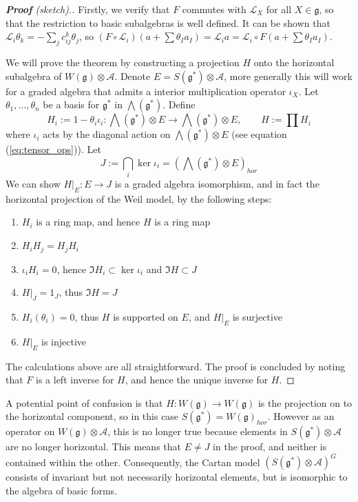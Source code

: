 \begin{proof}[\textbf{\textit{Proof}} (sketch).]
	Firstly, we verify that $F$ commutes with $\mathcal{L}_X$ for all
	$X\in\mathfrak{g}$, so that the restriction to basic subalgebras is well defined. 
	It can be shown that $\mathcal{L}_i \theta_k = -\sum_j c_{ij}^k\theta_j$, so
	$(F\circ \mathcal{L}_i)(a+\sum \theta_Ia_I) = \mathcal{L}_i a =
	\mathcal{L}_i \circ F(a+\sum \theta_Ia_I)$.

	We will prove the theorem by constructing a projection $H$ onto the horizontal
	subalgebra of $W(\mathfrak{g})\otimes \mathcal{A}$.
	Denote  $E=S(\mathfrak{g}^*)\otimes \mathcal{A}$, more generally this will
	work for a graded algebra that admits a interior multiplication operator
	$\iota_X$. Let $\theta_1,\ldots,\theta_n$ be a basis for $\mathfrak{g}^*$ in
	$\bigwedge (\mathfrak{g}^*)$. Define 
	 \[
		 H_i := 1 - \theta_i \iota_i : \bigwedge(\mathfrak{g}^*)\otimes E \to 
		\bigwedge(\mathfrak{g}^*)\otimes E, \qquad
		H := \prod H_i
	\] 
	where $\iota_i$ acts by the diagonal
	action on  $\bigwedge(\mathfrak{g}^*)\otimes E$ (see equation
	(\ref{eq:tensor_ops})). Let 
	\[
	J := \bigcap_i \ker \iota_i = (\bigwedge(\mathfrak{g}^*)\otimes E)_{hor}
	\] 
	We can show $H|_E : E \to J$ is a graded algebra isomorphism, and in fact
	the horizontal projection of the Weil model, by the following steps: 
	\begin{enumerate}[(1)]
	    \item $H_i$ is a ring map, and hence  $H$ is a ring map
		\item $H_iH_j = H_jH_i$ 
		\item $\iota_i H_i = 0$, hence  $\Im H_i \subset \ker \iota_i$ 
			and $\Im H \subset J$
		\item $H|_J = 1_J$, thus $\Im H = J$ 
		\item $H_i(\theta_i) = 0$, thus $H$ is supported on $E$, and $H|_E$ is surjective
		\item $H|_E$ is injective
	\end{enumerate}
	The calculations above are all straightforward. The proof is concluded by
	noting that $F$ is a left inverse for  $H$, and hence the unique
	inverse for $H$.
\end{proof}

\begin{remark} \label{remark:cartan_not_horizontal}
	A potential point of confusion is that $H:W(\mathfrak{g})\to W(\mathfrak{g})$ 
	is the projection on to the horizontal component, so in this case 
	$S(\mathfrak{g}^*) = W(\mathfrak{g})_{hor}$. However as an operator on
	$W(\mathfrak{g})\otimes \mathcal{A}$, this is no longer true because
	elements in $S(\mathfrak{g}^*)\otimes \mathcal{A}$ are no longer horizontal.
	This means that $E \neq J$ in the proof, and neither is contained within the other. 
	Consequently, the Cartan model  $(S(\mathfrak{g}^*)\otimes \mathcal{A})^G$
	consists of invariant but not necessarily horizontal elements, but is
	isomorphic to the algebra of basic forms.
\end{remark}

